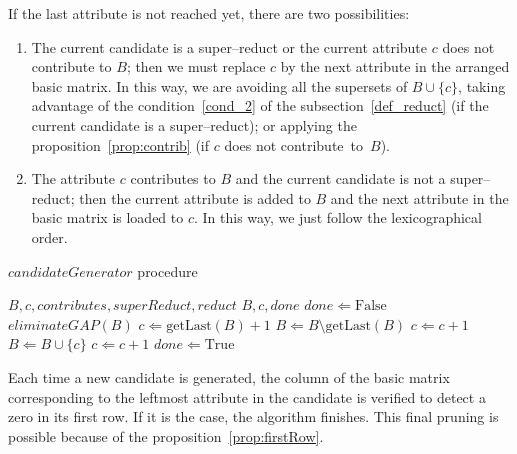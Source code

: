 \documentclass[number,preprint,review,12pt]{elsarticle}
\begin{document}
	If the last attribute is not reached yet, there are two possibilities:			
	\begin{enumerate}
		\item The current candidate is a super--reduct or the current attribute $c$ does not contribute to $B$; then we must replace $c$ by the next attribute in the arranged basic matrix. In this way, we are avoiding all the supersets of $B\cup\lbrace c\rbrace$, taking advantage of the condition~\ref{cond_2} of the subsection~\ref{def_reduct} (if the current candidate is a super--reduct); or applying the proposition~\ref{prop:contrib} (if $c$ does not contribute~to~$B$).
		
		\item The attribute $c$ contributes to $B$ and the current candidate is not a super--reduct; then the current attribute is added to $B$ and the next attribute in the basic matrix is loaded to $c$. In this way, we just follow the lexicographical order.
	\end{enumerate}  	
			
	\begin{algorithm}
		\footnotesize
		\caption{$candidateGenerator$ procedure}
		\label{alg:CandGenerator}
		\begin{algorithmic}[1]
			\Require \textit{$B,c,contributes,superReduct,reduct$}
			\Ensure $B,c,done$ 
			\State $done \Leftarrow \mathrm{False}$
			\label{line:cg} 
			\label{line:gap} 
			\State $eliminateGAP(B)$
			\EndIf
			\State $c \Leftarrow  \mathrm{getLast}(B)+1$
			\State $B \Leftarrow B\setminus \mathrm{getLast}(B)$\label{line:remLast}
			\Else
			\label{line:NCorSR}
			\State $c \Leftarrow c+1$\label{line:replaceC} 
			\Else
			\State $B \Leftarrow B\cup \lbrace c\rbrace$\label{line:add1} 
			\State $c \Leftarrow c+1$\label{line:add1End} 
			\EndIf
			\EndIf
			 \label{line:done}
			\State $done \Leftarrow \mathrm{True}$
			\EndIf
		\end{algorithmic}
	\end{algorithm}
	
	Each time a new candidate is generated, the column of the basic matrix corresponding to the leftmost attribute in the candidate is verified to detect a zero in its first row. If it is the case, the algorithm finishes. This final pruning is possible because of the proposition~\ref{prop:firstRow}.
	
\end{document}
